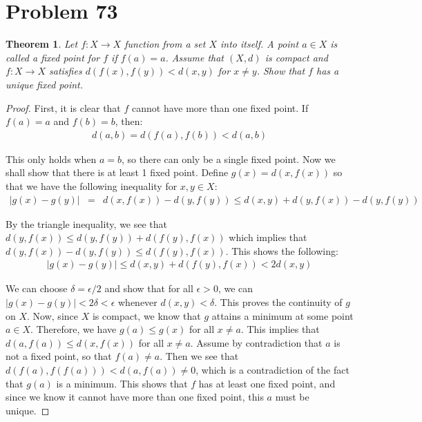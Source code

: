 \documentclass[psamsfonts]{amsart}
\newtheorem{thm}{Theorem}[section]
\theoremstyle{definition}
\theoremstyle{remark}
\numberwithin{equation}{section}
\begin{document}
\section{Problem 73}

\begin{thm}
Let $f: X \to X$ function from a set $X$ into itself. A point $a \in X$ is called a fixed point for $f$ if $f(a) = a$. Assume that $(X,d)$ is compact and $f:X \to X$ satisfies $d(f(x),f(y)) < d(x,y)$ for $x \neq y$. Show that $f$ has a unique fixed point. 
\end{thm}

\begin{proof}
First, it is clear that $f$ cannot have more than one fixed point. If $f(a) = a$ and $f(b) = b$, then:
\begin{eqnarray}
d(a,b) = d(f(a),f(b)) < d(a,b)
\end{eqnarray}

This only holds when $a = b$, so there can only be a single fixed point. Now we shall show that there is at least 1 fixed point. Define $g(x) = d(x,f(x))$ so that we have the following inequality for $x,y \in X$:
\begin{eqnarray}
|g(x) - g(y)| &=& d(x,f(x)) - d(y,f(y)) \leq d(x,y) + d(y,f(x)) - d(y,f(y))
\end{eqnarray}

By the triangle inequality, we see that $d(y,f(x)) \leq d(y,f(y)) + d(f(y),f(x))$ which implies that $d(y,f(x)) - d(y,f(y)) \leq d(f(y),f(x))$. This shows the following:
\begin{eqnarray}
|g(x) - g(y)| \leq d(x,y) + d(f(y),f(x)) < 2 d(x,y)
\end{eqnarray}

We can choose $\delta = \epsilon/2$ and show that for all $\epsilon > 0$, we can $|g(x) - g(y)| < 2 \delta < \epsilon$ whenever $d(x,y) < \delta$. This proves the continuity of $g$ on $X$. Now, since $X$ is compact, we know that $g$ attains a minimum at some point $a \in X$. Therefore, we have $g(a) \leq g(x)$ for all $x \neq a$. This implies that $d(a,f(a)) \leq d(x,f(x))$ for all $x \neq a$. Assume by contradiction that $a$ is not a fixed point, so that $f(a) \neq a$. Then we see that $d(f(a),f(f(a))) < d(a,f(a)) \neq 0$, which is a contradiction of the fact that $g(a)$ is a minimum. This shows that $f$ has at least one fixed point, and since we know it cannot have more than one fixed point, this $a$ must be unique.
\end{proof}
\end{document}
